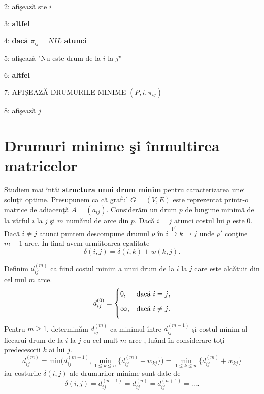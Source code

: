 \documentclass[11pt,a4paper]{report}
\begin{document}
     2:\hspace{0.6cm} afi\c seaz\u a ste $i$
     
     3: \textbf{altfel}
     
     4: \hspace{0.6cm}\textbf{dac\u a} $\pi_{ij}=NIL$ \textbf{atunci}
     
     5:\hspace{1.2cm} afi\c seaz\u a "Nu este drum de la $i$ la $j$" 
     
     6:\hspace{0.6cm} \textbf{altfel}
     
     7:\hspace{1.2cm} AFI\c SEAZ\u A-DRUMURILE-MINIME $(P,i,\pi_{ij})$
     
     8: afi\c seaz\u a $j$
     \vspace{0.3cm}
     
     \section{Drumuri minime \c si \^ inmultirea matricelor}
     
     Studiem mai \^ int\^ ai \textbf{structura unui drum minim} pentru caracterizarea unei solu\c tii optime. Presupunem ca c\u a graful $G=(V,E)$ este reprezentat printr-o matrice de adiacen\c t\u a $A=(a_{ij})$. Consider\u am un drum $p$ de lungime minim\u a de la v\^ arful $i$ la $j$ \c si $m$ num\u arul de arce din $p$. Dac\u a $i=j$ atunci costul lui $p$ este 0. Dac\u a $i\neq j$ atunci puntem descompune drumul $p$ \^ in $i\xrightarrow{\text{p'}}k\rightarrow j$ unde $p'$ con\c tine $m-1$ arce. \^ In final avem urm\u atoarea egalitate 
     \begin{equation*}
     \delta (i,j)=\delta (i,k)+w(k,j).
     \end{equation*}
     
     Definim $d_{ij}^{(m)}$ ca fiind costul minim a unui drum de la $i$ la $j$ care este alc\u atuit din cel mul $m$ arce.
     \begin{equation*}
		d_{ij}^{(0)}=
		\begin{cases}
		0,&\text{dac\u a $i=j$}, \medskip\\
		\infty,&\text{dac\u a $i\ne j$}.\medskip
		\end{cases}
	 \end{equation*}
	 Pentru $m\geq 1$, determin\u am $d_{ij}^{(m)}$ ca minimul \^ intre $d_{ij}^{(m-1)}$ \c si costul minim al fiecarui drum de la $i$ la $j$ cu cel mult $m$ arce , lu\^ and \^ in considerare to\c ti predecesorii $k$ ai lui $j$.
	 \begin{equation}
	 d_{ij}^{(m)}=\text{min} \bigg( d_{ij}^{(m-1)},\min_{1\leq k \leq n} \bigg\{  d_{ij}^{(m)}+w_{kj}\bigg\} \bigg) = \min_{1\leq k \leq n}\bigg\{  d_{ij}^{(m)}+w_{kj}\bigg\}
	 \end{equation}
     iar costurile $\delta (i,j)$ ale drumurilor minime sunt date de 
          \begin{equation*}
     \delta (i,j)=d_{ij}^{(n-1)}=d_{ij}^{(n)}=d_{ij}^{(n+1)}=....
     \end{equation*}
     
\end{document}
